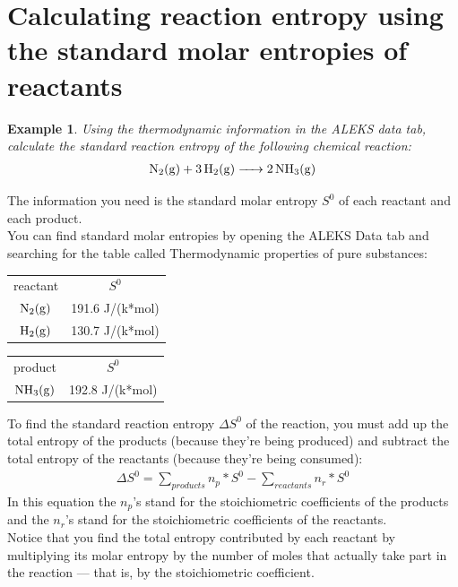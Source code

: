 \documentclass{article}  %
\newtheorem{exmp}{Example}
\begin{document}
\section*{Calculating reaction entropy using the standard molar entropies of reactants}
\begin{exmp}
    Using the thermodynamic information in the ALEKS data tab, calculate the standard reaction entropy of the following chemical reaction: 
    \begin{equation*}
        \begin{aligned}
            \ce{N2_(g) + 3 H2_(g) -> 2NH3_(g)}
        \end{aligned}
    \end{equation*}
\end{exmp}
The information you need is the standard molar entropy $S^0$ of each reactant and each product. \\
You can find standard molar entropies by opening the ALEKS Data tab and searching for the table called Thermodynamic properties of pure substances: \\
\begin{center}
    \begin{tabular}{c c}
        reactant & $S^0$ \\
        $\ce{N2_(g)}$ & 191.6 J/(k*mol) \\
        $\ce{H2_(g)}$ & 130.7 J/(k*mol) \\
    \end{tabular}
\end{center}

\begin{center}
    \begin{tabular}{c c}
        product & $S^0$ \\
        $\ce{NH3_(g)}$ & 192.8 J/(k*mol) 
    \end{tabular}
\end{center}
To find the standard reaction entropy $\Delta S^0$ of the reaction, you must add up the total entropy of the products (because they're being produced) and subtract the total entropy of the reactants (because they're being consumed): 
\begin{equation*}
    \begin{aligned}
        \Delta S^0 = \sum_{products} n_p * S^0 - \sum_{reactants} n_r * S^0
    \end{aligned}
\end{equation*}
In this equation the $n_p$'s stand for the stoichiometric coefficients of the products and the $n_r$'s stand for the stoichiometric coefficients of the reactants.  \\
Notice that you find the total entropy contributed by each reactant by multiplying its molar entropy by the number of moles that actually take part in the reaction — that is, by the stoichiometric coefficient.\\
\end{document}

